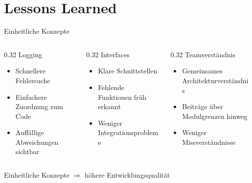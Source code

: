 \documentclass[aspectratio=169]{beamer}
\begin{document}
	\section{Lessons Learned}											%

	\begin{frame}{Einheitliche Konzepte}

		\begin{columns}[T]

		\begin{column}{0.32\textwidth}
		\centering
		\Large Logging

		\vspace{0.5em}

		\small
		\begin{itemize}
			\item Schnellere Fehlersuche
			\item Einfachere Zuordnung zum Code
			\item Auffällige Abweichungen sichtbar
		\end{itemize}
		\end{column}

		\begin{column}{0.32\textwidth}
		\centering
		\Large Interfaces

		\vspace{0.5em}

		\small
		\begin{itemize}
			\item Klare Schnittstellen
			\item Fehlende Funktionen früh erkannt
			\item Weniger Integrationsprobleme
		\end{itemize}
		\end{column}

		\begin{column}{0.32\textwidth}
		\centering
		\Large Teamverständnis

		\vspace{0.5em}

		\small
		\begin{itemize}
			\item Gemeinsames Architekturverständnis
			\item Beiträge über Modulgrenzen hinweg
			\item Weniger Missverständnisse
		\end{itemize}
		\end{column}

		\end{columns}

		\vfill

		\centering
		\Large
		Einheitliche Konzepte $\Rightarrow$ höhere Entwicklungsqualität

	\end{frame}
\end{document}
